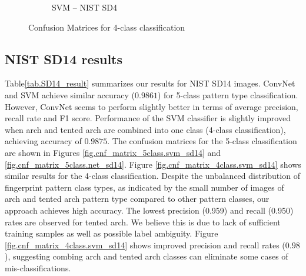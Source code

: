 \begin{figure}[!ht]
\begin{subfigure}[b]{0.25\textwidth}
		\caption{SVM -- NIST SD4}
		\label{fig.cnf_matrix_4class.svm_sd4}
	\end{subfigure}%

	\caption{Confusion Matrices for 4-class classification}\label{fig.cnf_matrix_4class}
\end{figure}

\subsection{NIST SD14 results}
\label{sec_sd14}

 Table\ref{tab.SD14_result} summarizes our results for NIST SD14 images.
%
ConvNet and SVM achieve similar accuracy ($0.9861$) for 5-class pattern type classification. 
%
However, ConvNet seems to perform slightly better in terms of average precision, recall rate and F1 score.
%
Performance of the SVM classifier is slightly improved when arch and tented arch are combined into one class (4-class classification), achieving accuracy of $0.9875$.
%
The confusion matrices for the 5-class classification are shown in Figures \ref{fig.cnf_matrix_5class.svm_sd14} and \ref{fig.cnf_matrix_5class.net_sd14}.
Figure \ref{fig.cnf_matrix_4class.svm_sd14} shows similar results for the 4-class classification.
%
Despite the unbalanced distribution of fingerprint pattern class types, as indicated by the small number of images of arch and tented arch pattern type compared to other pattern classes, our approach achieves high accuracy.
%
The lowest precision (0.959) and recall (0.950) rates are observed for tented arch.  We believe this is due to lack of sufficient training samples as well as possible label ambiguity.
%
Figure \ref{fig.cnf_matrix_4class.svm_sd14} shows improved precision and recall rates ($0.98$), suggesting combing arch and tented arch classes can eliminate some cases of mis-classifications.

